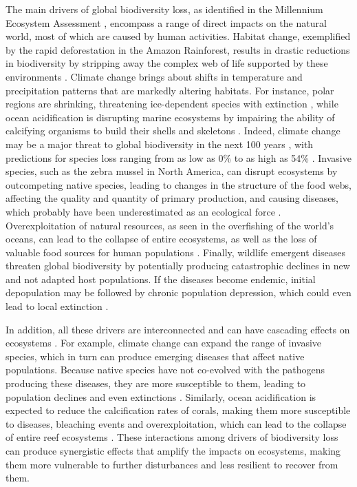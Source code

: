 The main drivers of global biodiversity loss, as identified in the Millennium
Ecosystem Assessment \cite{MEA2005}, encompass a range of
direct impacts on the natural world, most of which are caused by human
activities. Habitat change, exemplified by the rapid deforestation in the
Amazon Rainforest, results in drastic reductions in biodiversity by stripping
away the complex web of life supported by these environments
\cite{Laurance2012}. Climate change brings about shifts in temperature and
precipitation patterns that are markedly altering habitats. For instance, polar
regions are shrinking, threatening ice-dependent species with extinction
\cite{Post2013}, while ocean acidification is disrupting marine ecosystems by
impairing the ability of calcifying organisms to build their shells and
skeletons \cite{kroeker2013impacts}. Indeed, climate change may be a major
threat to global biodiversity in the next 100 years
\cite{Thomas2004,Loarie2009,Pimm2009,Warren2013,Warren2018}, with
predictions for species loss ranging from as low as 0\% to as high as 54\%
\cite{Urban2015}. Invasive species, such as the zebra mussel in North America,
can disrupt ecosystems by outcompeting native species, leading to changes in
the structure of the food webs, affecting the quality and quantity of primary
production, and causing diseases, which probably have been underestimated as an
ecological force \cite{Strayer2010}. Overexploitation of natural
resources, as seen in the overfishing of the world's oceans, can lead to the
collapse of entire ecosystems, as well as the loss of valuable food sources for
human populations \cite{Dayton1995,Coleman2002}. Finally, wildlife emergent
diseases threaten global biodiversity by potentially producing catastrophic
declines in new and not adapted host populations. If the diseases become
endemic, initial depopulation may be followed by chronic population depression,
which could even lead to local extinction \cite{Daszak2000}.


In addition, all these drivers are interconnected and can have cascading
effects
on ecosystems \cite{Mora2007}. For example, climate change can expand the range
of invasive species, which in turn can produce emerging diseases that affect
native populations. Because native species have not co-evolved with the
pathogens producing these diseases, they are more susceptible to them, leading
to population declines and even extinctions \cite{Daszak2000}. Similarly,
ocean acidification is expected to reduce the calcification rates of corals,
making them more susceptible to diseases, bleaching events and
overexploitation, which can lead to the collapse of entire reef ecosystems
\cite{Hoegh-Guldberg2007}. These interactions among drivers of biodiversity
loss can produce synergistic effects that amplify the impacts on ecosystems,
making them more vulnerable to further disturbances and less resilient to
recover from them.

